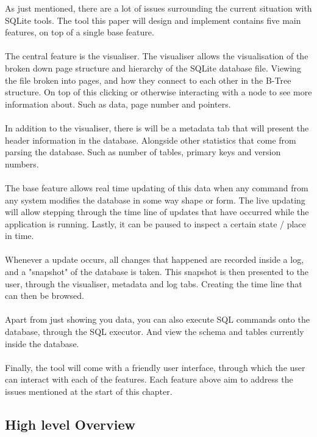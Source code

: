 As just mentioned, there are a lot of issues surrounding the current situation with SQLite tools. The tool this paper will design and implement contains five main features, on top of a single base feature.
\\\\
The central feature is the visualiser. The visualiser allows the visualisation of the broken down page structure and hierarchy of the SQLite database file. Viewing the file broken into pages, and how they connect to each other in the B-Tree structure. On top of this clicking or otherwise interacting with a node to see more information about. Such as data, page number and pointers.
\\\\
In addition to the visualiser, there is will be a metadata tab that will present the header information in the database. Alongside other statistics that come from parsing the database. Such as number of tables, primary keys and version numbers.
\\\\
The base feature allows real time updating of this data when any command from any system modifies the database in some way shape or form. The live updating will allow stepping through the time line of updates that have occurred while the application is running. Lastly, it can be paused to inspect a certain state / place in time. 
\\\\
Whenever a update occurs, all changes that happened are recorded inside a log, and a "snapshot" of the database is taken. This snapshot is then presented to the user, through the visualiser, metadata and log tabs. Creating the time line that can then be browsed. 
\\\\
Apart from just showing you data, you can also execute SQL commands onto the database, through the SQL executor. And view the schema and tables currently inside the database. 
\\\\
Finally, the tool will come with a friendly user interface, through which the user can interact with each of the features. Each feature above aim to address the issues mentioned at the start of this chapter.

\subsection{High level Overview}
\label{subsec:high_level_overview}

